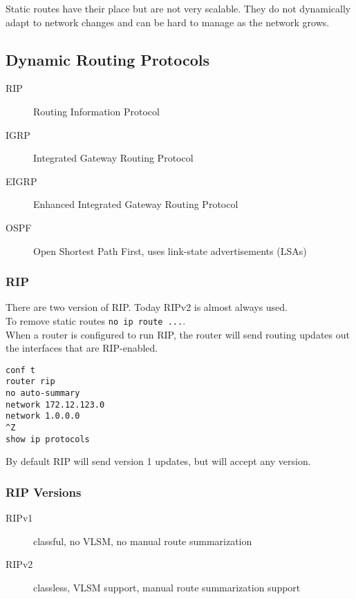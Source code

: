 Static routes have their place but are not very scalable. They do not
dynamically adapt to network changes and can be hard to manage as the network
grows.

\subsection{Dynamic Routing Protocols}

\begin{description}
\item[RIP]
Routing Information Protocol
\item[IGRP]
Integrated Gateway Routing Protocol
\item[EIGRP]
Enhanced Integrated Gateway Routing Protocol
\item[OSPF]
Open Shortest Path First, uses link-state advertisements (LSAs)
\end{description}

\subsubsection{RIP}

There are two version of RIP. Today RIPv2 is almost always used.\\

To remove static routes \texttt{no ip route ...}.\\

When a router is configured to run RIP, the router will send routing updates
out the interfaces that are RIP-enabled.

\begin{verbatim}
conf t
router rip
no auto-summary
network 172.12.123.0
network 1.0.0.0
^Z
show ip protocols
\end{verbatim}

By default RIP will send version 1 updates, but will accept any version.

\subsubsection{RIP Versions}

\begin{description}
\item[RIPv1]
classful, no VLSM, no manual route summarization
\item[RIPv2]
classless, VLSM support, manual route summarization support
\end{description}

